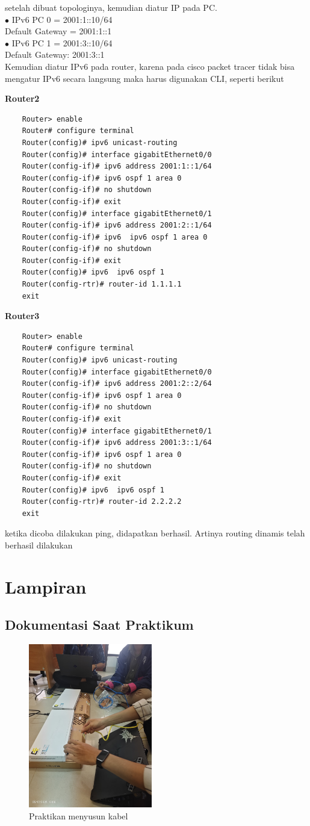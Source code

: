 setelah dibuat topologinya, kemudian diatur IP pada PC.\\
$\bullet$ IPv6 PC 0 = 2001:1::10/64\\
Default Gateway = 2001:1::1\\
$\bullet$ IPv6 PC 1 = 2001:3::10/64\\
Default Gateway: 2001:3::1\\

Kemudian diatur IPv6 pada router, karena pada cisco packet tracer tidak bisa mengatur IPv6 secara langsung maka harus digunakan CLI, seperti berikut

\textbf{Router2}\\
\begin{verbatim}
	Router> enable
	Router# configure terminal
	Router(config)# ipv6 unicast-routing
	Router(config)# interface gigabitEthernet0/0
	Router(config-if)# ipv6 address 2001:1::1/64
	Router(config-if)# ipv6 ospf 1 area 0
	Router(config-if)# no shutdown
	Router(config-if)# exit
	Router(config)# interface gigabitEthernet0/1
	Router(config-if)# ipv6 address 2001:2::1/64
	Router(config-if)# ipv6  ipv6 ospf 1 area 0
	Router(config-if)# no shutdown
	Router(config-if)# exit
	Router(config)# ipv6  ipv6 ospf 1
	Router(config-rtr)# router-id 1.1.1.1
	exit
\end{verbatim}
\textbf{Router3}
\begin{verbatim}
	Router> enable
	Router# configure terminal
	Router(config)# ipv6 unicast-routing
	Router(config)# interface gigabitEthernet0/0
	Router(config-if)# ipv6 address 2001:2::2/64
	Router(config-if)# ipv6 ospf 1 area 0
	Router(config-if)# no shutdown
	Router(config-if)# exit
	Router(config)# interface gigabitEthernet0/1
	Router(config-if)# ipv6 address 2001:3::1/64
	Router(config-if)# ipv6 ospf 1 area 0
	Router(config-if)# no shutdown
	Router(config-if)# exit
	Router(config)# ipv6  ipv6 ospf 1
	Router(config-rtr)# router-id 2.2.2.2
	exit
\end{verbatim}
ketika dicoba dilakukan ping, didapatkan berhasil. Artinya routing dinamis telah berhasil dilakukan
\newpage
\section{Lampiran}

\subsection{Dokumentasi Saat Praktikum}

\begin{figure}[H]
    \centering
    \includegraphics[width=0.48\textwidth]{img/Lampiran1.jpeg}
    \caption{Praktikan menyusun kabel}
    \label{fig:lmp1}
\end{figure}


